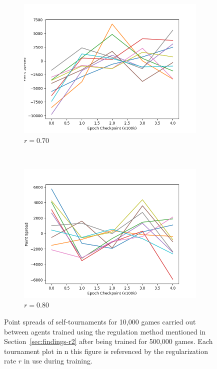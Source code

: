 \begin{figure}
	\begin{subfigure}[t]{0.48\textwidth}
		\center
		\includegraphics[width=\textwidth]{images/findings/experiments/regularization/tourny/reg_070-kyttuhat-strict-500k.png}
		\caption{$r = 0.70$}
		\label{fig:reg-tournies-0.70}
	\end{subfigure}
	~
	\begin{subfigure}[t]{0.48\textwidth}
		\center
		\includegraphics[width=\textwidth]{images/findings/experiments/regularization/tourny/reg_080-kyttuhat-strict-500k.png}
		\caption{$r = 0.80$}
		\label{fig:reg-tournies-0.80}
	\end{subfigure}

\caption{
	Point spreads of self-tournaments for 10,000 games
	carried out between agents trained using
	the regulation method mentioned in Section~\ref{sec:findings-r2} after being
	trained for 500,000 games.
	Each tournament plot in n this figure is referenced by the regularization
	rate $r$ in use during training.
}
\label{fig:reg-tournies}
\end{figure}
